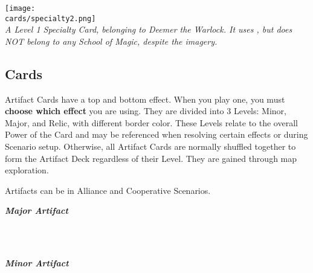 \begin{multicols*}{2}
{
    \medskip
    \centering
    \texttt{[image: \\cards/specialty2.png]}\\
    \medskip
    \footnotesize\textit{A Level 1 Specialty Card, belonging to Deemer the Warlock. It uses , but does NOT belong to any School of Magic, despite the imagery.}
}

\subsection*{ Cards}

Artifact Cards have a top and bottom effect. When you play one, you must \textbf{choose which effect} you are using.
They are divided into 3 Levels: Minor, Major, and Relic, with different border color.
These Levels relate to the overall Power of the Card and may be referenced when resolving certain effects or during Scenario setup.
Otherwise, all Artifact Cards are normally shuffled together to form the Artifact Deck regardless of their Level.
They are gained through map exploration.\par
Artifacts can be  in Alliance and Cooperative Scenarios.\par
\begin{multicols*}{2}
  \begin{scriptsize}
  \end{scriptsize}
  \footnotesize
    \null\hfill\textbf{\textit{\textcolor{darkcandyapplered}{Major Artifact}}}
  \columnbreak
  \begin{center}
    \phantom{\ldots}\\
    \phantom{\ldots}
    \begin{scriptsize}
    \end{scriptsize}\\
    \phantom{\ldots}\textbf{\textit{\textcolor{darkcandyapplered}{Minor Artifact}}}\\

\end{center}
\end{multicols*}
\end{multicols*}
